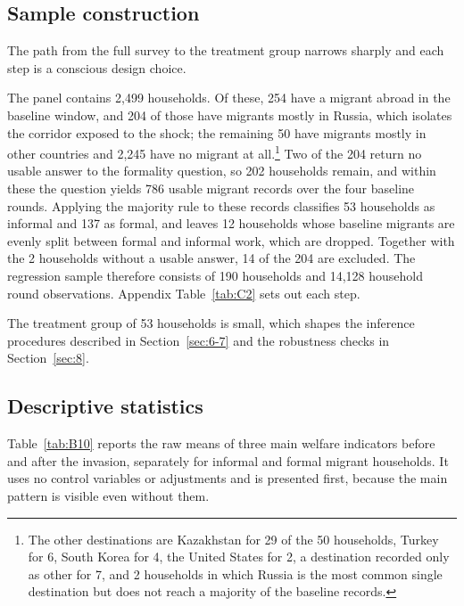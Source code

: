 \subsection{Sample construction}\label{sec:5-5}

The path from the full survey to the treatment group narrows sharply and each step is a conscious design choice.

The panel contains 2,499 households. Of these, 254 have a migrant abroad in the baseline window, and 204 of those have migrants mostly in Russia, which isolates the corridor exposed to the shock; the remaining 50 have migrants mostly in other countries and 2,245 have no migrant at all.\footnote{The other destinations are Kazakhstan for 29 of the 50 households, Turkey for 6, South Korea for 4, the United States for 2, a destination recorded only as other for 7, and 2 households in which Russia is the most common single destination but does not reach a majority of the baseline records.} Two of the 204 return no usable answer to the formality question, so 202 households remain, and within these the question yields 786 usable migrant records over the four baseline rounds. Applying the majority rule to these records classifies 53 households as informal and 137 as formal, and leaves 12 households whose baseline migrants are evenly split between formal and informal work, which are dropped. Together with the 2 households without a usable answer, 14 of the 204 are excluded. The regression sample therefore consists of 190 households and 14,128 household round observations. Appendix Table~\ref{tab:C2} sets out each step.

The treatment group of 53 households is small, which shapes the inference procedures described in Section~\ref{sec:6-7} and the robustness checks in Section~\ref{sec:8}.

\subsection{Descriptive statistics}\label{sec:5-6}

Table~\ref{tab:B10} reports the raw means of three main welfare indicators before and after the invasion, separately for informal and formal migrant households. It uses no control variables or adjustments and is presented first, because the main pattern is visible even without them.

